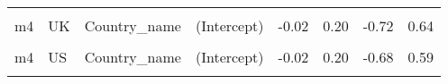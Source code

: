 \begin{table}
\begin{tabular}[t]{llllrrrr}
\cellcolor{gray!10}{m4} & \cellcolor{gray!10}{SE} & \cellcolor{gray!10}{Country\_name} & \cellcolor{gray!10}{EPS} & \cellcolor{gray!10}{-0.10} & \cellcolor{gray!10}{0.11} & \cellcolor{gray!10}{-0.37} & \cellcolor{gray!10}{0.16}\\
m4 & UK & Country\_name & (Intercept) & -0.02 & 0.20 & -0.72 & 0.64\\
\cellcolor{gray!10}{m4} & \cellcolor{gray!10}{UK} & \cellcolor{gray!10}{Country\_name} & \cellcolor{gray!10}{EPS} & \cellcolor{gray!10}{-0.05} & \cellcolor{gray!10}{0.11} & \cellcolor{gray!10}{-0.31} & \cellcolor{gray!10}{0.19}\\
m4 & US & Country\_name & (Intercept) & -0.02 & 0.20 & -0.68 & 0.59\\
\cellcolor{gray!10}{m4} & \cellcolor{gray!10}{US} & \cellcolor{gray!10}{Country\_name} & \cellcolor{gray!10}{EPS} & \cellcolor{gray!10}{-0.03} & \cellcolor{gray!10}{0.11} & \cellcolor{gray!10}{-0.31} & \cellcolor{gray!10}{0.23}\\
\bottomrule
\end{tabular}
\end{table}
